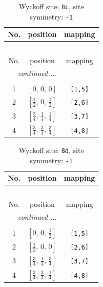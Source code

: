\documentclass[fleqn,8pt]{jsarticle}
\begin{document}
\renewcommand{\arraystretch}{1.2}
\begin{longtable}{ccc}
\caption{Wyckoff site: {\tt 8c}, site symmetry: {\tt -1}}
 \\
 \hline \hline
No. & position & mapping \\ \hline \endfirsthead

\multicolumn{2}{l}{\tablename\ \thetable{}} \\
 \hline \hline
No. & position & mapping \\ \hline \endhead

 \hline \hline
\multicolumn{2}{r}{\footnotesize\it continued ...} \\ \endfoot

 \hline \hline
\multicolumn{2}{r}{} \\ \endlastfoot

1 & $\left[ 0,\, 0,\, 0 \right]$ & {\tt [1,5]} \\ \hline
2 & $\left[ \frac{1}{2},\, 0,\, \frac{1}{2} \right]$ & {\tt [2,6]} \\ \hline
3 & $\left[ \frac{3}{4},\, \frac{1}{4},\, \frac{1}{4} \right]$ & {\tt [3,7]} \\ \hline
4 & $\left[ \frac{3}{4},\, \frac{3}{4},\, \frac{3}{4} \right]$ & {\tt [4,8]} \\
\end{longtable}
\renewcommand{\arraystretch}{1.2}
\begin{longtable}{ccc}
\caption{Wyckoff site: {\tt 8d}, site symmetry: {\tt -1}}
 \\
 \hline \hline
No. & position & mapping \\ \hline \endfirsthead

\multicolumn{2}{l}{\tablename\ \thetable{}} \\
 \hline \hline
No. & position & mapping \\ \hline \endhead

 \hline \hline
\multicolumn{2}{r}{\footnotesize\it continued ...} \\ \endfoot

 \hline \hline
\multicolumn{2}{r}{} \\ \endlastfoot

1 & $\left[ 0,\, 0,\, \frac{1}{2} \right]$ & {\tt [1,5]} \\ \hline
2 & $\left[ \frac{1}{2},\, 0,\, 0 \right]$ & {\tt [2,6]} \\ \hline
3 & $\left[ \frac{3}{4},\, \frac{1}{4},\, \frac{3}{4} \right]$ & {\tt [3,7]} \\ \hline
4 & $\left[ \frac{3}{4},\, \frac{3}{4},\, \frac{1}{4} \right]$ & {\tt [4,8]} \\
\end{longtable}
\end{document}
